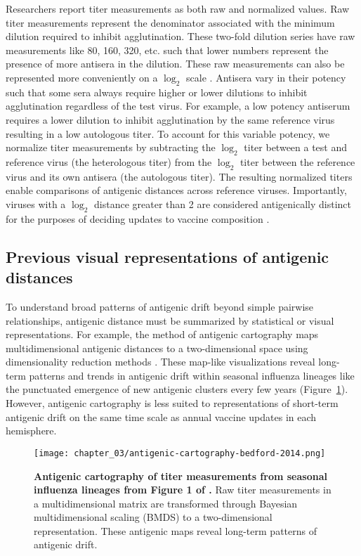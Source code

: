 Researchers report titer measurements as both raw and normalized values.
Raw titer measurements represent the denominator associated with the minimum dilution required to inhibit agglutination.
These two-fold dilution series have raw measurements like 80, 160, 320, etc. such that lower numbers represent the presence of more antisera in the dilution.
These raw measurements can also be represented more conveniently on a $\log_{2}$ scale \citep{Smith:2004jc,Bedford:2014bf}.
Antisera vary in their potency such that some sera always require higher or lower dilutions to inhibit agglutination regardless of the test virus.
For example, a low potency antiserum requires a lower dilution to inhibit agglutination by the same reference virus resulting in a low autologous titer.
To account for this variable potency, we normalize titer measurements by subtracting the $\log_{2}$ titer between a test and reference virus (the heterologous titer) from the $\log_{2}$ titer between the reference virus and its own antisera (the autologous titer).
The resulting normalized titers enable comparisons of antigenic distances across reference viruses.
Importantly, viruses with a $\log_{2}$ distance greater than 2 are considered antigenically distinct for the purposes of deciding updates to vaccine composition \citep{}.

\subsection{Previous visual representations of antigenic distances}

To understand broad patterns of antigenic drift beyond simple pairwise relationships, antigenic distance must be summarized by statistical or visual representations.
For example, the method of antigenic cartography maps multidimensional antigenic distances to a two-dimensional space using dimensionality reduction methods \citep{Smith:2004jc,Bedford:2014bf}.
These map-like visualizations reveal long-term patterns and trends in antigenic drift within seasonal influenza lineages like the punctuated emergence of new antigenic clusters every few years (Figure~\ref{fig:antigenic-cartography-bedford-2014}).
However, antigenic cartography is less suited to representations of short-term antigenic drift on the same time scale as annual vaccine updates in each hemisphere.

\begin{figure}
  \centering
  \texttt{[image: chapter\_03/antigenic-cartography-bedford-2014.png]}
  \caption[{Antigenic cartography of titer measurements from seasonal influenza lineages from Figure 1 of \citet{Bedford:2014bf}.}]{\label{fig:antigenic-cartography-bedford-2014} {\bf Antigenic cartography of titer measurements from seasonal influenza lineages from Figure 1 of \citet{Bedford:2014bf}.}
    Raw titer measurements in a multidimensional matrix are transformed through Bayesian multidimensional scaling (BMDS) to a two-dimensional representation.
    These antigenic maps reveal long-term patterns of antigenic drift.}
\end{figure}

